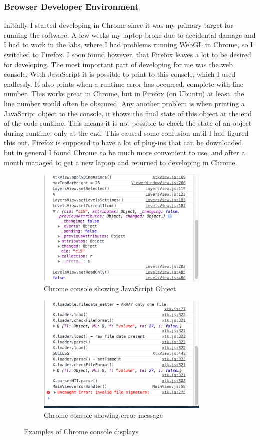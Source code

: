 \documentclass[a4paper,11pt,titlepage]{article}
\begin{document}
\subsubsection{Browser Developer Environment}

Initially I started developing in Chrome since it was my primary target for running the software. A few weeks my laptop broke due to accidental damage and I had to work in the labs, where I had problems running WebGL in Chrome, so I switched to Firefox. I soon found however, that Firefox leaves a lot to be desired for developing. The most important part of developing for me was the web console. With JavaScript it is possible to print to this console, which I used endlessly. It also prints when a runtime error has occurred, complete with line number. This works great in Chrome, but in Firefox (on Ubuntu) at least, the line number would often be obscured. Any another problem is when printing a JavaScript object to the console, it shows the final state of this object at the end of the code runtime. This means it is not possible to check the state of an object during runtime, only at the end. This caused some confusion until I had figured this out. Firefox is supposed to have a lot of plug-ins that can be downloaded, but in general I found Chrome to be much more convenient to use, and after a month managed to get a new laptop and returned to developing in Chrome.


\begin{figure}
\centering
\begin{subfigure}{.5\textwidth}
  \centering
  \includegraphics[width=82mm]{graphics/console_01.png}
  \caption{Chrome console showing JavaScript Object}
\end{subfigure}%
\begin{subfigure}{.5\textwidth}
  \centering
  \includegraphics[width=82mm]{graphics/console_02.png}
  \caption{Chrome console showing error message}
\end{subfigure}
\caption{Examples of Chrome console displays}

\end{figure}
\end{document}
